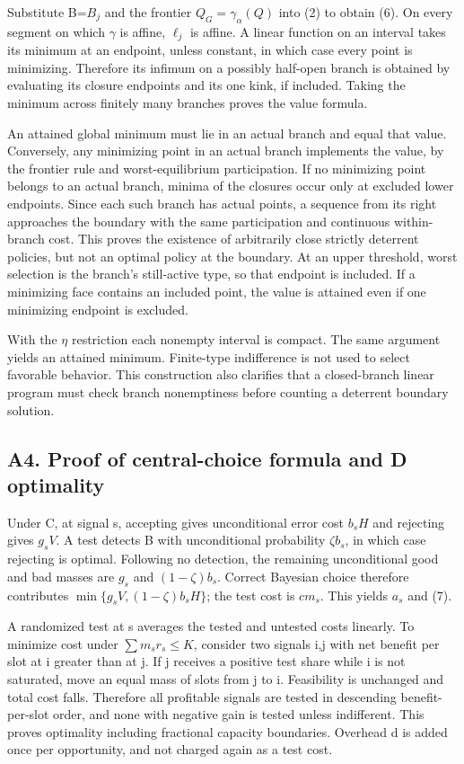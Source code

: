 \documentclass[
  11pt,
]{article}
\begin{document}
Substitute B=\(B_j\) and the frontier \(Q_G=\gamma_\alpha(Q)\) into (2)
to obtain (6). On every segment on which \(\gamma\) is affine,
\(\ell_j\) is affine. A linear function on an interval takes its minimum
at an endpoint, unless constant, in which case every point is
minimizing. Therefore its infimum on a possibly half-open branch is
obtained by evaluating its closure endpoints and its one kink, if
included. Taking the minimum across finitely many branches proves the
value formula.

An attained global minimum must lie in an actual branch and equal that
value. Conversely, any minimizing point in an actual branch implements
the value, by the frontier rule and worst-equilibrium participation. If
no minimizing point belongs to an actual branch, minima of the closures
occur only at excluded lower endpoints. Since each such branch has
actual points, a sequence from its right approaches the boundary with
the same participation and continuous within-branch cost. This proves
the existence of arbitrarily close strictly deterrent policies, but not
an optimal policy at the boundary. At an upper threshold, worst
selection is the branch's still-active type, so that endpoint is
included. If a minimizing face contains an included point, the value is
attained even if one minimizing endpoint is excluded.

With the \(\eta\) restriction each nonempty interval is compact. The
same argument yields an attained minimum. Finite-type indifference is
not used to select favorable behavior. This construction also clarifies
that a closed-branch linear program must check branch nonemptiness
before counting a deterrent boundary solution.

\subsection{A4. Proof of central-choice formula and D
optimality}\label{a4.-proof-of-central-choice-formula-and-d-optimality}

Under C, at signal s, accepting gives unconditional error cost \(b_sH\)
and rejecting gives \(g_sV\). A test detects B with unconditional
probability \(\zeta b_s\), in which case rejecting is optimal. Following
no detection, the remaining unconditional good and bad masses are
\(g_s\) and \((1-\zeta)b_s\). Correct Bayesian choice therefore
contributes \(\min\{g_sV,(1-\zeta)b_sH\}\); the test cost is \(cm_s\).
This yields \(a_s\) and (7).

A randomized test at s averages the tested and untested costs linearly.
To minimize cost under \(\sum m_sr_s\leq K\), consider two signals i,j
with net benefit per slot at i greater than at j. If j receives a
positive test share while i is not saturated, move an equal mass of
slots from j to i. Feasibility is unchanged and total cost falls.
Therefore all profitable signals are tested in descending
benefit-per-slot order, and none with negative gain is tested unless
indifferent. This proves optimality including fractional capacity
boundaries. Overhead d is added once per opportunity, and not charged
again as a test cost.
\end{document}
